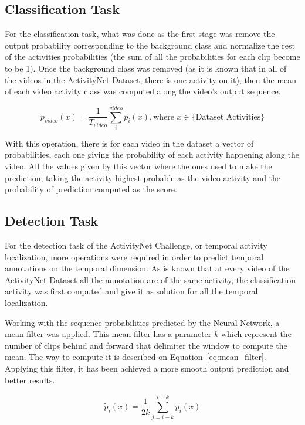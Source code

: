 \subsection{Classification Task}

For the classification task, what was done as the first stage was remove the output probability corresponding to the background class and normalize the rest of the activities probabilities (the sum of all the probabilities for each clip become to be 1). Once the background class was removed (as it is known that in all of the videos in the ActivityNet Dataset, there is one activity on it), then the mean of each video activity class was computed along the video's output sequence.

\begin{equation}
	p_{video}(x) = \frac{1}{T_{video}} \sum_i^{video} p_i(x), \text{where } x \in \{ \text{Dataset Activities}\}
\end{equation}

With this operation, there is for each video in the dataset a vector of probabilities, each one giving the probability of each activity happening along the video. All the values given by this vector where the ones used to make the prediction, taking the activity highest probable as the video activity and the probability of prediction computed as the score.

\subsection{Detection Task}
 
For the detection task of the ActivityNet Challenge, or temporal activity localization, more operations were required in order to predict temporal annotations on the temporal dimension. As is known that at every video of the ActivityNet Dataset all the annotation are of the same activity, the classification activity was first computed and give it as solution for all the temporal localization.

Working with the sequence probabilities predicted by the Neural Network, a mean filter was applied. This mean filter has a parameter $k$ which represent the number of clips behind and forward that delimiter the window to compute the mean. The way to compute it is described on Equation~\ref{eq:mean_filter}. Applying this filter, it has been achieved a more smooth output prediction and better results.

\begin{equation}
	\tilde{p}_i(x) = \frac{1}{2k} \sum_{j=i-k}^{i+k} p_i(x)
    \label{eq:mean_filter}
\end{equation}

